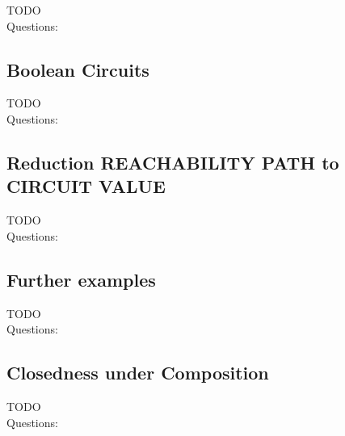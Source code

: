 \documentclass[a4]{scrartcl}
\begin{document}
\color{red} TODO \\
\color{black}
\color{violet} Questions:
\color{black}








\subsection*{Boolean Circuits}


\color{red} TODO \\
\color{black}
\color{violet} Questions:
\color{black}









\subsection*{Reduction REACHABILITY PATH to CIRCUIT VALUE}

\color{red} TODO \\
\color{black}
\color{violet} Questions:
\color{black}








\subsection*{Further examples}

\color{red} TODO \\
\color{black}
\color{violet} Questions:
\color{black}








\subsection*{Closedness under Composition}


\color{red} TODO \\
\color{black}
\color{violet} Questions:
\color{black}





\newpage

\printbibliography
\end{document}
